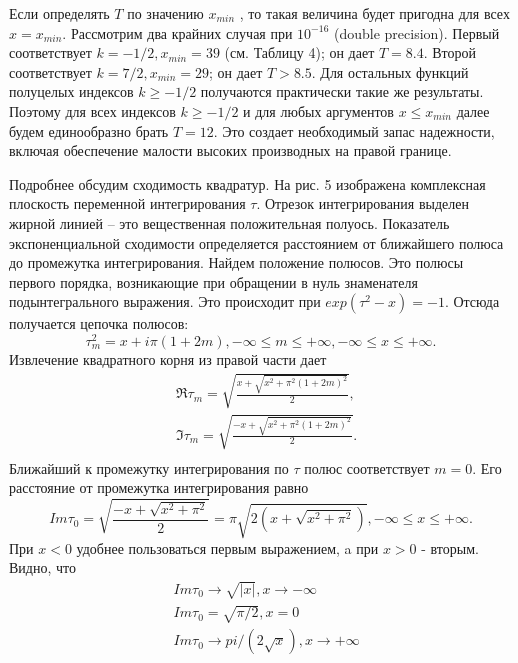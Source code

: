 Если определять $T$ по значению $x_{min}$ , то такая величина будет пригодна
для всех $x = x_{min}$. Рассмотрим два крайних случая при $10^{-16}$ (double
precision). Первый соответствует $k = -1/2, x_{min} = 39$ (см. Таблицу 4); он дает
$T = 8.4$. Второй соответствует $k = 7/2, x_{min} = 29$; он дает $T > 8.5$. Для
остальных функций полуцелых индексов $k \geqslant -1/2$ получаются практически
такие же результаты. Поэтому для всех индексов $k \geqslant -1/2$ и для любых
аргументов $x \leqslant x_{min}$ далее будем единообразно брать $T=12$. Это создает
необходимый запас надежности, включая обеспечение малости высоких
производных на правой границе.

Подробнее обсудим сходимость квадратур. На рис. 5 изображена
комплексная плоскость переменной интегрирования $\tau$. Отрезок
интегрирования выделен жирной линией – это вещественная положительная
полуось. Показатель экспоненциальной сходимости определяется расстоянием
от ближайшего полюса до промежутка интегрирования. Найдем положение полюсов. Это полюсы первого порядка, возникающие при обращении в нуль знаменателя подынтегрального выражения. Это происходит при $exp(\tau^2 -x) = -1$. Отсюда получается цепочка полюсов:
\begin{equation}
\tau_m^2 = x + i\pi(1+2m), -\infty \leqslant m \leqslant +\infty, -\infty \leqslant x \leqslant +\infty.
\label{eq:ref_4_5_4}
\end{equation}
Извлечение квадратного корня из правой части дает
\begin{equation}
\begin{aligned}
&\Re{\tau_m} = \sqrt{\frac{x+\sqrt{x^2 + \pi^2(1+2m)^2}}{2}}, \\
&\Im{\tau_m} = \sqrt{\frac{-x+\sqrt{x^2 + \pi^2(1+2m)^2}}{2}}. \\
\end{aligned}
\label{eq:ref_4_5_5}
\end{equation}
Ближайший к промежутку интегрирования по $\tau$ полюс соответствует $m=0$. Его расстояние от промежутка интегрирования равно
\begin{equation}
Im \tau_0 = \sqrt{\frac{-x+\sqrt{x^2 + \pi^2}}{2}} = \pi \sqrt{2(x+\sqrt{x^2+\pi^2})}, -\infty \leqslant x \leqslant +\infty.
\label{eq:ref_4_5_6}
\end{equation}
При $x < 0$ удобнее пользоваться первым выражением, a при $x>0$ - вторым. Видно, что 
\begin{equation}
\begin{aligned}
&Im \tau_0 \to \sqrt{|x|}, x \to -\infty \\
&Im \tau_0 = \sqrt{\pi / 2}, x=0 \\
&Im \tau_0 \to  pi /(2\sqrt{x}), x \to +\infty \\
\end{aligned}
\label{eq:ref_4_5_7}
\end{equation}
